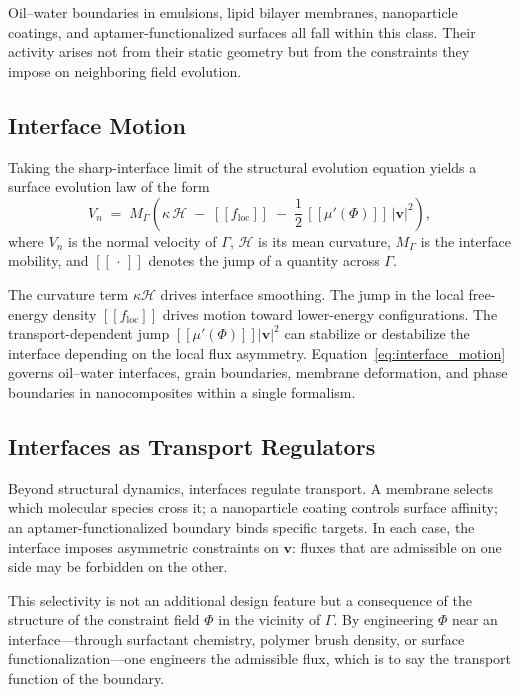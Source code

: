 \documentclass[11pt, a4paper, twocolumn]{article}
\providecommand{\llbracket}{[\![}
\providecommand{\rrbracket}{]\!]}
\begin{document}
Oil--water boundaries in emulsions, lipid bilayer membranes, nanoparticle
coatings, and aptamer-functionalized surfaces all fall within this class. Their
activity arises not from their static geometry but from the constraints they
impose on neighboring field evolution.

\subsection{Interface Motion}

Taking the sharp-interface limit of the structural evolution equation yields a
surface evolution law of the form
\begin{equation}
    V_n
    \;=\;
    M_\Gamma \left(
        \kappa\,\mathcal{H}
        \;-\;
        \llbracket f_{\mathrm{loc}} \rrbracket
        \;-\;
        \frac{1}{2}\,\llbracket \mu'(\Phi) \rrbracket\,|\mathbf{v}|^2
    \right),
    \label{eq:interface_motion}
\end{equation}
where $V_n$ is the normal velocity of $\Gamma$, $\mathcal{H}$ is its mean
curvature, $M_\Gamma$ is the interface mobility, and
$\llbracket\,\cdot\,\rrbracket$ denotes the jump of a quantity across $\Gamma$.

The curvature term $\kappa\mathcal{H}$ drives interface smoothing. The jump in
the local free-energy density $\llbracket f_{\mathrm{loc}} \rrbracket$ drives
motion toward lower-energy configurations. The transport-dependent jump
$\llbracket\mu'(\Phi)\rrbracket|\mathbf{v}|^2$ can stabilize or destabilize
the interface depending on the local flux asymmetry. Equation~\eqref{eq:interface_motion}
governs oil--water interfaces, grain boundaries, membrane deformation, and
phase boundaries in nanocomposites within a single formalism.

\subsection{Interfaces as Transport Regulators}

Beyond structural dynamics, interfaces regulate transport. A membrane selects
which molecular species cross it; a nanoparticle coating controls surface
affinity; an aptamer-functionalized boundary binds specific targets. In each
case, the interface imposes asymmetric constraints on $\mathbf{v}$: fluxes
that are admissible on one side may be forbidden on the other.

This selectivity is not an additional design feature but a consequence of the
structure of the constraint field $\Phi$ in the vicinity of $\Gamma$. By
engineering $\Phi$ near an interface---through surfactant chemistry, polymer
brush density, or surface functionalization---one engineers the admissible
flux, which is to say the transport function of the boundary.
\end{document}

